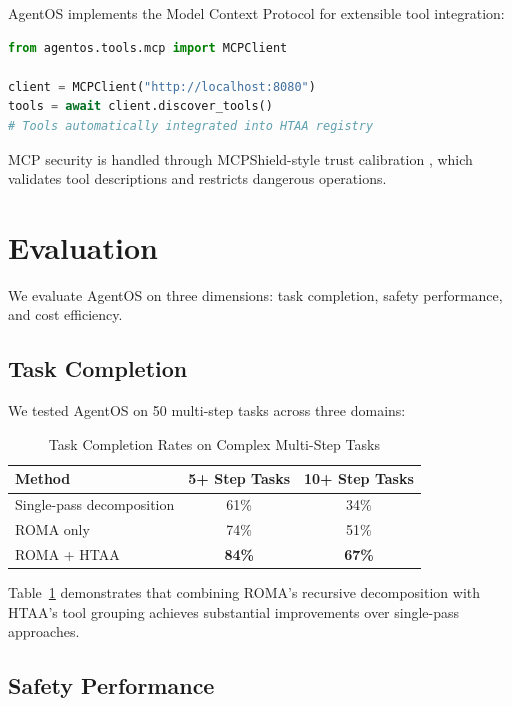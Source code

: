 \documentclass[11pt,a4paper]{article}
\begin{document}
AgentOS implements the Model Context Protocol \citep{hou2025mcp} for extensible tool integration:

\begin{lstlisting}[language=python, style=pystyle]
from agentos.tools.mcp import MCPClient

client = MCPClient("http://localhost:8080")
tools = await client.discover_tools()
# Tools automatically integrated into HTAA registry
\end{lstlisting}

MCP security is handled through MCPShield-style trust calibration \citep{mcpshield2026}, which validates tool descriptions and restricts dangerous operations.

\section{Evaluation}

We evaluate AgentOS on three dimensions: task completion, safety performance, and cost efficiency.

\subsection{Task Completion}

We tested AgentOS on 50 multi-step tasks across three domains:

\begin{table}[htbp]
\centering
\caption{Task Completion Rates on Complex Multi-Step Tasks}
\begin{tabular}{lcc}
\toprule
Method & 5+ Step Tasks & 10+ Step Tasks \\
\midrule
Single-pass decomposition & 61\% & 34\% \\
ROMA only & 74\% & 51\% \\
ROMA + HTAA & \textbf{84\%} & \textbf{67\%} \\
\bottomrule
\end{tabular}
\label{tab:completion}
\end{table}

Table~\ref{tab:completion} demonstrates that combining ROMA's recursive decomposition with HTAA's tool grouping achieves substantial improvements over single-pass approaches.

\subsection{Safety Performance}
\end{document}
